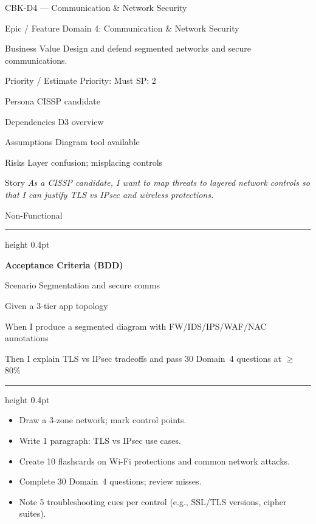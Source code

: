 \documentclass[11pt,a4paper]{article}
\providecommand{\square}{\fbox{\rule{0pt}{0.85ex}\rule{0.85ex}{0pt}}}%
\newcommand{\citem}{\item[$\square$]}
\newcommand{\Tag}[1]{\tcbox[on line, colback=PillBack, colframe=PillBack,
  coltext=PillText, boxrule=0pt, arc=2mm, left=2pt, right=2pt, top=1pt, bottom=1pt]{\small #1}}
\newcommand{\ThinRule}{\par\vspace{4pt}\hrule height 0.4pt\par\vspace{4pt}}
\begin{document}
\clearpage
\begin{StoryCardBox}{CBK-D4 --- Communication \& Network Security}
\begin{metadesc}
\item[Epic / Feature] Domain 4: Communication \& Network Security
\item[Business Value] Design and defend segmented networks and secure communications.
\item[Priority / Estimate] Priority: Must \quad SP: 2
\item[Persona] CISSP candidate
\item[Dependencies] D3 overview
\item[Assumptions] Diagram tool available
\item[Risks] Layer confusion; misplacing controls
\item[Story] \textit{As a CISSP candidate, I want to map threats to layered network controls so that I can justify TLS vs IPsec and wireless protections.}
\item[Non-Functional] \Tag{Security} \Tag{Reliability}
\end{metadesc}

\ThinRule
\textbf{Acceptance Criteria (BDD)}
\begin{metadesc}
\item[Scenario] Segmentation and secure comms
\item[Given] a 3-tier app topology
\item[When] I produce a segmented diagram with FW/IDS/IPS/WAF/NAC annotations
\item[Then] I explain TLS vs IPsec tradeoffs and pass 30 Domain~4 questions at $\geq$ 80\%
\end{metadesc}

\ThinRule
\begin{TasksBox}
\begin{itemize}
  \citem Draw a 3-zone network; mark control points.
  \citem Write 1 paragraph: TLS vs IPsec use cases.
  \citem Create 10 flashcards on Wi-Fi protections and common network attacks.
  \citem Complete 30 Domain~4 questions; review misses.
  \citem Note 5 troubleshooting cues per control (e.g., SSL/TLS versions, cipher suites).
\end{itemize}
\end{TasksBox}
\end{StoryCardBox}
\end{document}
